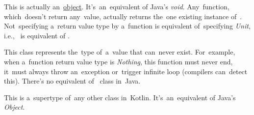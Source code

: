 
\label{kotlinunit}
This is actually an~\hyperref[kotlinobject]{object}.
It's~an~equivalent of Java's \textit{void}.
Any~function, which~doesn't return any~value, actually returns the~one existing instance of~.
Not~specifying a~return value type by a~function is equivalent of~specifying \textit{Unit}, \mbox{i.e.,}~ is equivalent of .

\label{kotlinnothing}
This class represents the~type of~a~value that can~never exist.
For~example, when a~function return value type is \textit{Nothing}, this function must never end, it~must always throw an~exception or~trigger infinite loop (compilers can~detect this).
There's no equivalent of~ class in~Java.

This is a~supertype of~any other class in~Kotlin.
It's~an~equivalent of Java's \textit{Object}.
\newpage
